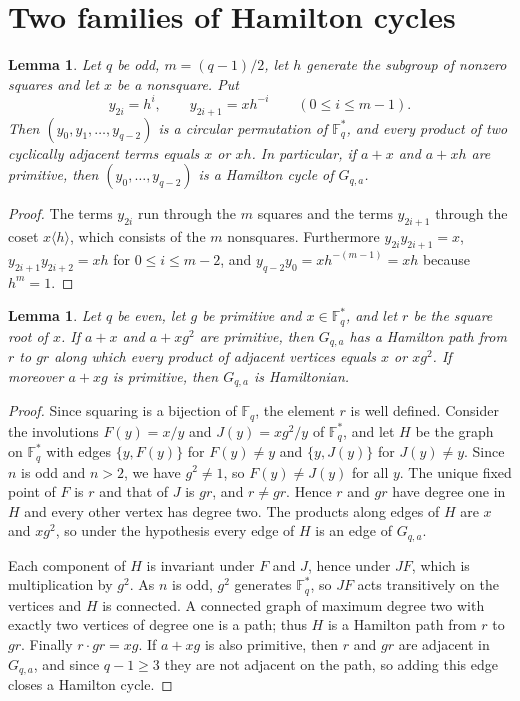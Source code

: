 \documentclass{amsart}
\newtheorem{lemma}[theorem]{Lemma}
\theoremstyle{remark}
\numberwithin{equation}{section}
\numberwithin{table}{section}
\newcommand{\F}{\mathbb{F}}
\begin{document}
\section{Two families of Hamilton cycles}\label{sec:witness}

\begin{lemma}\label{lem:odd}
Let $q$ be odd, $m=(q-1)/2$, let $h$ generate the subgroup of nonzero squares and let $x$ be a nonsquare. Put
\[
y_{2i}=h^{i},\qquad y_{2i+1}=xh^{-i}\qquad(0\le i\le m-1).
\]
Then $(y_0,y_1,\dots,y_{q-2})$ is a circular permutation of $\F_q^{*}$, and every product of two cyclically adjacent terms equals $x$ or $xh$. In particular, if $a+x$ and $a+xh$ are primitive, then $(y_0,\dots,y_{q-2})$ is a Hamilton cycle of $G_{q,a}$.
\end{lemma}

\begin{proof}
The terms $y_{2i}$ run through the $m$ squares and the terms $y_{2i+1}$ through the coset $x\langle h\rangle$, which consists of the $m$ nonsquares. Furthermore $y_{2i}y_{2i+1}=x$, $y_{2i+1}y_{2i+2}=xh$ for $0\le i\le m-2$, and $y_{q-2}y_0=xh^{-(m-1)}=xh$ because $h^{m}=1$.
\end{proof}

\begin{lemma}\label{lem:even}
Let $q$ be even, let $g$ be primitive and $x\in\F_q^{*}$, and let $r$ be the square root of $x$. If $a+x$ and $a+xg^2$ are primitive, then $G_{q,a}$ has a Hamilton path from $r$ to $gr$ along which every product of adjacent vertices equals $x$ or $xg^{2}$. If moreover $a+xg$ is primitive, then $G_{q,a}$ is Hamiltonian.
\end{lemma}

\begin{proof}
Since squaring is a bijection of $\F_q$, the element $r$ is well defined. Consider the involutions $F(y)=x/y$ and $J(y)=xg^{2}/y$ of $\F_q^{*}$, and let $H$ be the graph on $\F_q^{*}$ with edges $\{y,F(y)\}$ for $F(y)\neq y$ and $\{y,J(y)\}$ for $J(y)\neq y$. Since $n$ is odd and $n>2$, we have $g^{2}\neq1$, so $F(y)\neq J(y)$ for all $y$. The unique fixed point of $F$ is $r$ and that of $J$ is $gr$, and $r\neq gr$. Hence $r$ and $gr$ have degree one in $H$ and every other vertex has degree two. The products along edges of $H$ are $x$ and $xg^2$, so under the hypothesis every edge of $H$ is an edge of $G_{q,a}$.

Each component of $H$ is invariant under $F$ and $J$, hence under $JF$, which is multiplication by $g^{2}$. As $n$ is odd, $g^{2}$ generates $\F_q^{*}$, so $JF$ acts transitively on the vertices and $H$ is connected. A connected graph of maximum degree two with exactly two vertices of degree one is a path; thus $H$ is a Hamilton path from $r$ to $gr$. Finally $r\cdot gr=xg$. If $a+xg$ is also primitive, then $r$ and $gr$ are adjacent in $G_{q,a}$, and since $q-1\ge3$ they are not adjacent on the path, so adding this edge closes a Hamilton cycle.
\end{proof}
\end{document}
